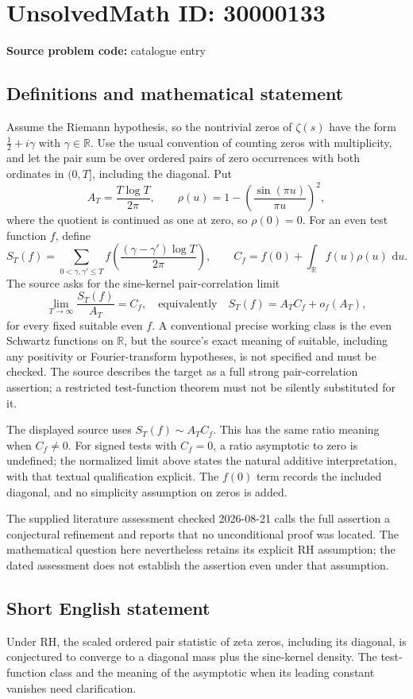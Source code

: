 \documentclass[11pt]{article}
\newcommand{\R}{\mathbb{R}}
\newcommand{\dd}{\,\mathrm{d}}
\begin{document}
\section*{UnsolvedMath ID: 30000133}
\textbf{Source problem code:} catalogue entry
\subsection{Definitions and mathematical statement}
Assume the Riemann hypothesis, so the nontrivial zeros of \(\zeta(s)\) have the form \(\tfrac12+i\gamma\) with \(\gamma\in\R\). Use the usual convention of counting zeros with multiplicity, and let the pair sum be over ordered pairs of zero occurrences with both ordinates in \((0,T]\), including the diagonal. Put
\[
A_T=\frac{T\log T}{2\pi},\qquad
\rho(u)=1-\left(\frac{\sin(\pi u)}{\pi u}\right)^2,
\]
where the quotient is continued as one at zero, so \(\rho(0)=0\). For an even test function \(f\), define
\[
S_T(f)=\sum_{0<\gamma,\gamma'\leq T}
f\left(\frac{(\gamma-\gamma')\log T}{2\pi}\right),
\qquad C_f=f(0)+\int_{\R}f(u)\rho(u)\,\dd u.
\]
The source asks for the sine-kernel pair-correlation limit
\[
\lim_{T\to\infty}\frac{S_T(f)}{A_T}=C_f,
\quad\text{equivalently}\quad S_T(f)=A_TC_f+o_f(A_T),
\]
for every fixed suitable even \(f\). A conventional precise working class is the even Schwartz functions on \(\R\), but the source's exact meaning of suitable, including any positivity or Fourier-transform hypotheses, is not specified and must be checked. The source describes the target as a full strong pair-correlation assertion; a restricted test-function theorem must not be silently substituted for it.

The displayed source uses \(S_T(f)\sim A_TC_f\). This has the same ratio meaning when \(C_f\ne0\). For signed tests with \(C_f=0\), a ratio asymptotic to zero is undefined; the normalized limit above states the natural additive interpretation, with that textual qualification explicit. The \(f(0)\) term records the included diagonal, and no simplicity assumption on zeros is added.

The supplied literature assessment checked 2026-08-21 calls the full assertion a conjectural refinement and reports that no unconditional proof was located. The mathematical question here nevertheless retains its explicit RH assumption; the dated assessment does not establish the assertion even under that assumption.
\subsection{Short English statement}
Under RH, the scaled ordered pair statistic of zeta zeros, including its diagonal, is conjectured to converge to a diagonal mass plus the sine-kernel density. The test-function class and the meaning of the asymptotic when its leading constant vanishes need clarification.
\end{document}
